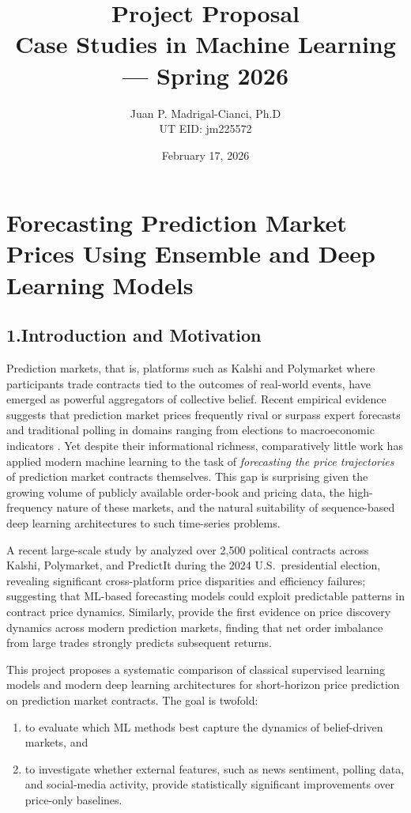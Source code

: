 \documentclass[12pt]{article}
\title{\textbf{Project Proposal} \\[6pt]
       \large Case Studies in Machine Learning --- Spring 2026}
\author{Juan P. Madrigal-Cianci, Ph.D \\ UT EID: jm225572}
\date{February 17, 2026}
\begin{document}
\maketitle

\section*{Forecasting Prediction Market Prices Using Ensemble and Deep Learning Models}

\subsection*{1.\quad Introduction and Motivation}

Prediction markets, that is, platforms such as Kalshi and Polymarket where participants trade contracts tied to the outcomes of real-world events, have emerged as powerful aggregators of collective belief.
Recent empirical evidence suggests that prediction market prices frequently rival or surpass expert forecasts and traditional polling in domains ranging from elections to macroeconomic indicators \citep{Arrow2008, Wolfers2004}.
Yet despite their informational richness, comparatively little work has applied modern machine learning to the task of \textit{forecasting the price trajectories} of prediction market contracts themselves.
This gap is surprising given the growing volume of publicly available order-book and pricing data, the high-frequency nature of these markets, and the natural suitability of sequence-based deep learning architectures to such time-series problems.

A recent large-scale study by \citet{Clinton2025} analyzed over 2{,}500 political contracts across Kalshi, Polymarket, and PredictIt during the 2024 U.S.\ presidential election, revealing significant cross-platform price disparities and efficiency failures; suggesting that ML-based forecasting models could exploit predictable patterns in contract price dynamics.
Similarly, \citet{ng2025price} provide the first evidence on price discovery dynamics across modern prediction markets, finding that net order imbalance from large trades strongly predicts subsequent returns.

This project proposes a systematic comparison of classical supervised learning models and modern deep learning architectures for short-horizon price prediction on prediction market contracts.
The goal is twofold: 
\begin{enumerate}
\item to evaluate which ML methods best capture the dynamics of belief-driven markets, and 
\item to investigate whether external features, such as news sentiment, polling data, and social-media activity, provide statistically significant improvements over price-only baselines.
\end{enumerate}
\end{document}
